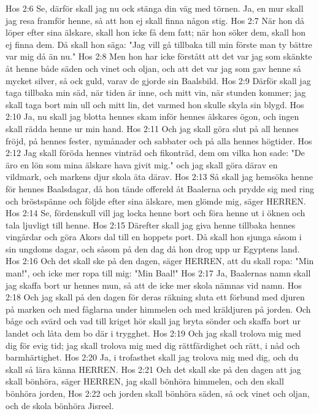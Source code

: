 Hos 2:6  Se, därför skall jag nu ock stänga din väg med törnen. Ja, en mur skall jag resa framför henne, så att hon ej skall finna någon stig.
Hos 2:7  När hon då löper efter sina älskare, skall hon icke få dem fatt; när hon söker dem, skall hon ej finna dem. Då skall hon säga: "Jag vill gå tillbaka till min förste man ty bättre var mig då än nu."
Hos 2:8  Men hon har icke förstått att det var jag som skänkte åt henne både säden och vinet och oljan, och att det var jag som gav henne så mycket silver, så ock guld, varav de gjorde sin Baalsbild.
Hos 2:9  Därför skall jag taga tillbaka min säd, när tiden är inne, och mitt vin, när stunden kommer; jag skall taga bort min ull och mitt lin, det varmed hon skulle skyla sin blygd.
Hos 2:10  Ja, nu skall jag blotta hennes skam inför hennes älskares ögon, och ingen skall rädda henne ur min hand.
Hos 2:11  Och jag skall göra slut på all hennes fröjd, på hennes fester, nymånader och sabbater och på alla hennes högtider.
Hos 2:12  Jag skall föröda hennes vinträd och fikonträd, dem om vilka hon sade: "De äro en lön som mina älskare hava givit mig." och jag skall göra därav en vildmark, och markens djur skola äta därav.
Hos 2:13  Så skall jag hemsöka henne för hennes Baalsdagar, då hon tände offereld åt Baalerna och prydde sig med ring och bröstspänne och följde efter sina älskare, men glömde mig, säger HERREN.
Hos 2:14  Se, fördenskull vill jag locka henne bort och föra henne ut i öknen och tala ljuvligt till henne.
Hos 2:15  Därefter skall jag giva henne tillbaka hennes vingårdar och göra Akors dal till en hoppets port. Då skall hon sjunga såsom i sin ungdoms dagar, och såsom på den dag då hon drog upp ur Egyptens land.
Hos 2:16  Och det skall ske på den dagen, säger HERREN, att du skall ropa: "Min man!", och icke mer ropa till mig: "Min Baal!"
Hos 2:17  Ja, Baalernas namn skall jag skaffa bort ur hennes mun, så att de icke mer skola nämnas vid namn.
Hos 2:18  Och jag skall på den dagen för deras räkning sluta ett förbund med djuren på marken och med fåglarna under himmelen och med kräldjuren på jorden. Och båge och svärd och vad till kriget hör skall jag bryta sönder och skaffa bort ur landet och låta dem bo där i trygghet.
Hos 2:19  Och jag skall trolova mig med dig för evig tid; jag skall trolova mig med dig rättfärdighet och rätt, i nåd och barmhärtighet.
Hos 2:20  Ja, i trofasthet skall jag trolova mig med dig, och du skall så lära känna HERREN.
Hos 2:21  Och det skall ske på den dagen att jag skall bönhöra, säger HERREN, jag skall bönhöra himmelen, och den skall bönhöra jorden,
Hos 2:22  och jorden skall bönhöra säden, så ock vinet och oljan, och de skola bönhöra Jisreel.
